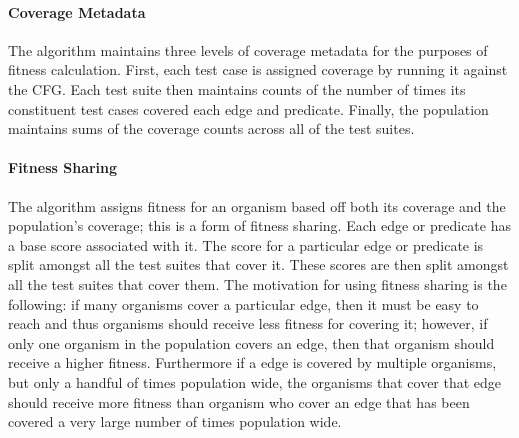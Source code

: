 \documentclass[runningheads]{llncs}
\begin{document}
\paragraph{Coverage Metadata}
The algorithm maintains three levels of coverage metadata for the purposes of fitness calculation. First, each test case is assigned coverage by running it against the CFG. Each test suite then maintains counts of the number of times its constituent test cases covered each edge and predicate. Finally, the population maintains sums of the coverage counts across all of the test suites.

\paragraph{Fitness Sharing}
The algorithm assigns fitness for an organism based off both its coverage and the population's coverage; this is a form of fitness sharing. Each edge or predicate has a base score associated with it. The score for a particular edge or predicate is split amongst all the test suites that cover it. These scores are then split amongst all the test suites that cover them. The motivation for using fitness sharing is the following: if many organisms cover a particular edge, then it must be easy to reach and thus organisms should receive less fitness for covering it; however, if only one organism in the population covers an edge, then that organism should receive a higher fitness. Furthermore if a edge is covered by multiple organisms, but only a handful of times population wide, the organisms that cover that edge should receive more fitness than organism who cover an edge that has been covered a very large number of times population wide.

\begin{comment} Maybe not needed?
\subsubsection{Test Case Generation and Search} 
The main test case search occurs by crossing over and mutating test cases within organisms, as well as applying local optimization heuristics that manipulate or replace an organism's test cases. As mentioned above the algorithm begins by thoroughly searching the space of possible test cases composed of parameters from singular ranges of the range set. After many generations of no improvements using test case crossover and local optimization, the algorithm performs two key perturbation procedures. First the range set adapts itself based on information learned regarding the fruitfulness of its constituent ranges. Then test suite crossover and mutation are applied to mix up the available input parameters inside of test suites.
\end{comment}
\end{document}
